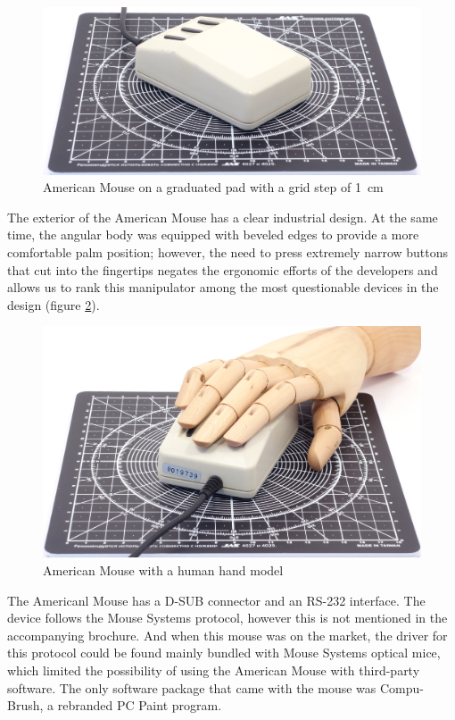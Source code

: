 \documentclass[11pt, a4paper]{article}
\begin{document}
\begin{figure}[h]
    \centering
    \includegraphics[scale=0.5]{1986_american_mouse/size_30.jpg}
    \caption{American Mouse on a graduated pad with a grid step of 1~cm}
    \label{fig:AmericanSize}
\end{figure}

The exterior of the American Mouse has a clear industrial design. At the same time, the angular body was equipped with beveled edges to provide a more comfortable palm position; however, the need to press extremely narrow buttons that cut into the fingertips negates the ergonomic efforts of the developers and allows us to rank this manipulator among the most questionable devices in the design (figure \ref{fig:AmericanHand}).

\begin{figure}[h]
    \centering
    \includegraphics[scale=0.5]{1986_american_mouse/hand_30.jpg}
    \caption{American Mouse with a human hand model}
    \label{fig:AmericanHand}
\end{figure}

The Americanl Mouse has a D-SUB connector and an RS-232 interface. The device follows the Mouse Systems protocol, however this is not mentioned in the accompanying brochure. And when this mouse was on the market, the driver for this protocol could be found mainly bundled with Mouse Systems optical mice, which limited the possibility of using the American Mouse with third-party software. The only software package that came with the mouse was Compu-Brush, a rebranded PC Paint program.
\end{document}
